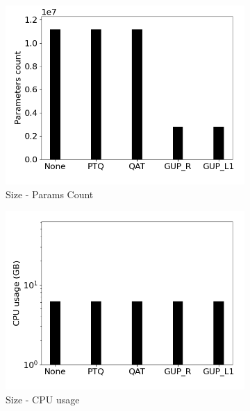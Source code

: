 \begin{figure}[]
\begin{subfigure}{0.19\textwidth}
        \includegraphics[width=1\textwidth]{other/figures/Resnet18_CIFAR10_Laptop/Parameters_count.png}
        \caption{Size - Params Count}
    \end{subfigure}
    \begin{subfigure}{0.19\textwidth}
        \includegraphics[width=1\textwidth]{other/figures/Resnet18_CIFAR10_Laptop/CPU_usage.png}
        \caption{Size - CPU usage}
    \end{subfigure}
    \begin{subfigure}{0.19\textwidth}

\end{subfigure}
\end{figure}
